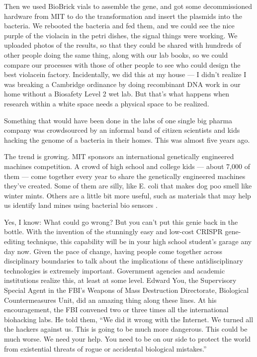 Then we used BioBrick vials to assemble the gene, and got some decommissioned hardware from MIT to do the transformation and insert the plasmids into the bacteria. We rebooted the bacteria and fed them, and we could see the nice purple of the violacin in the petri dishes, the signal things were working. We uploaded photos of the results, so that they could be shared with hundreds of other people doing the same thing, along with our lab books, so we could compare our processes with those of other people to see who could design the best violacein factory. Incidentally, we did this at my house --- I didn't realize I was breaking a Cambridge ordinance by doing recombinant DNA work in our home without a Biosafety Level 2 wet lab. But that's what happens when research within a white space needs a physical space to be realized.

Something that would have been done in the labs of one single big pharma company was crowdsourced by an informal band of citizen scientists and kids hacking the genome of a bacteria in their homes. This was almost five years ago.

The trend is growing. MIT sponsors an international genetically engineered machines competition. A crowd of high school and college kids --- about 7,000 of them --- come together every year to share the genetically engineered machines they've created. Some of them are silly, like E. coli that makes dog poo smell like winter mints. Others are a little bit more useful, such as materials that may help us identify land mines using bacterial bio sensors \cite{ELECTRACE2014iGem}. 

Yes, I know: What could go wrong? But you can't put this genie back in the bottle. With the invention of the stunningly easy and low-cost CRISPR gene-editing technique, this capability will be in your high school student's garage any day now. Given the pace of change, having people come together across disciplinary boundaries to talk about the implications of these antidisciplinary technologies is extremely important. Government agencies and academic institutions realize this, at least at some level. Edward You, the Supervisory Special Agent in the FBI's Weapons of Mass Destruction Directorate, Biological Countermeasures Unit, did an amazing thing along these lines. At his encouragement, the FBI convened two or three times all the international biohacking labs. He told them, ``We did it wrong with the Internet. We turned all the hackers against us. This is going to be much more dangerous. This could be much worse. We need your help. You need to be on our side to protect the world from existential threats of rogue or accidental biological mistakes.'' 

